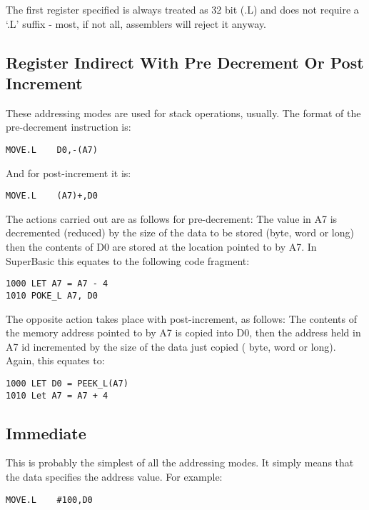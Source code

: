 The first register specified is always treated as 32 bit (.L) and
      does not require a `.L' suffix -{} most, if not all, assemblers will
      reject it anyway.

\subsection{Register Indirect With Pre Decrement Or Post Increment}\address{Register Indirect With Pre Decrement Or Post Increment}

These addressing modes are used for stack operations, usually. The
      format of the pre-{}decrement instruction is: 
\begin{lstlisting}[firstnumber=1,]
          MOVE.L    D0,-(A7) 
\end{lstlisting}
       And for post-{}increment it is: 
\begin{lstlisting}[firstnumber=1,]
          MOVE.L    (A7)+,D0 
\end{lstlisting}


The actions carried out are as follows for pre-{}decrement: The
      value in A7 is decremented (reduced) by the size of the data to be
      stored (byte, word or long) then the contents of D0 are stored at the
      location pointed to by A7. In SuperBasic this equates to the following
      code fragment: 
\begin{lstlisting}[firstnumber=1,language={[Visual]Basic}]
1000 LET A7 = A7 - 4
1010 POKE_L A7, D0 
\end{lstlisting}


The opposite action takes place with post-{}increment, as follows:
      The contents of the memory address pointed to by A7 is copied into D0,
      then the address held in A7 id incremented by the size of the data just
      copied ( byte, word or long). Again, this equates to: 
\begin{lstlisting}[firstnumber=1,language={}]
1000 LET D0 = PEEK_L(A7)
1010 Let A7 = A7 + 4 
\end{lstlisting}


\subsection{Immediate}\address{Immediate}

This is probably the simplest of all the addressing modes. It
      simply means that the data specifies the address value. For example:
 
\begin{lstlisting}[firstnumber=1,]
          MOVE.L    #100,D0 
\end{lstlisting}


